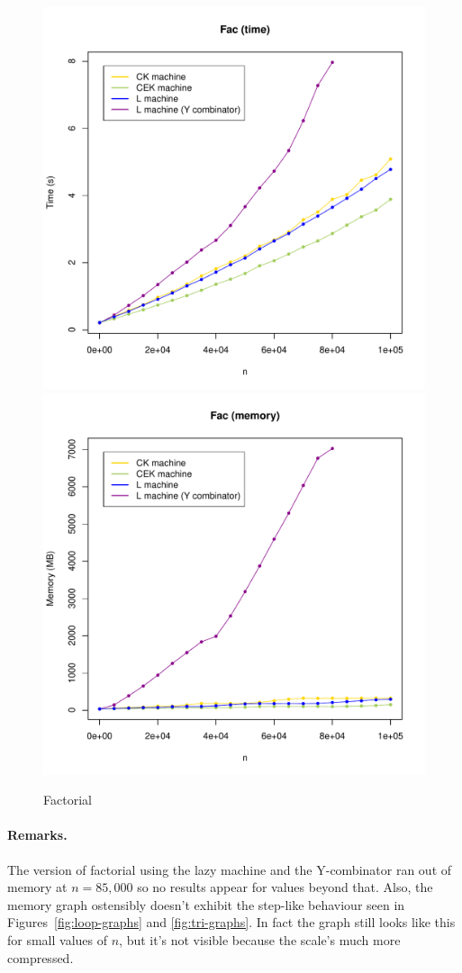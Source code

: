 \documentclass[a4paper]{article}
\begin{document}
\begin{figure}[H]
\centering
\includegraphics[width=0.7\linewidth]{figs/fac-times.pdf}
\includegraphics[width=0.7\linewidth]{figs/fac-mem.pdf}
\caption{Factorial}\label{fig:fac-graphs}
\end{figure}

\paragraph{Remarks.}  The version of factorial using the lazy machine and the Y-combinator 
ran out of memory at $n=85,000$ so no results appear for values beyond
that. Also, the memory graph ostensibly doesn't exhibit the step-like
behaviour seen in Figures~\ref{fig:loop-graphs} and
\ref{fig:tri-graphs}.  In fact the graph still looks like this for
small values of $n$, but it's not visible  because the scale's much more compressed.
\end{document}

